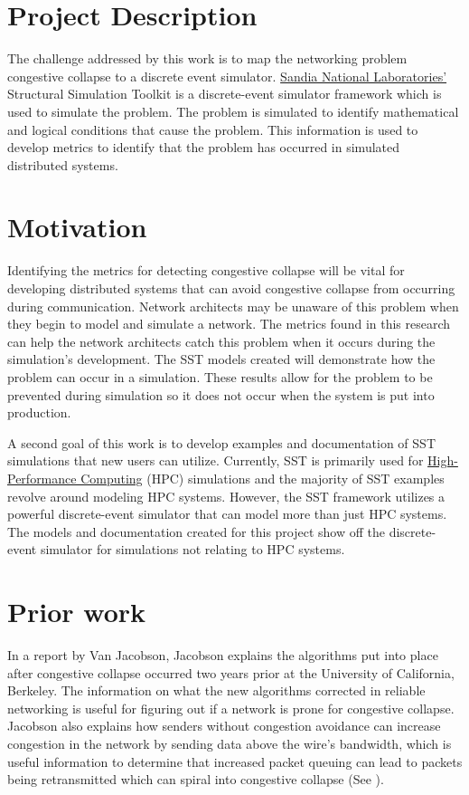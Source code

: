 \documentclass{article}
\begin{document}
\section{Project Description} %

The challenge addressed by this work is to map the networking problem congestive collapse to a discrete event simulator. \href{https://www.sandia.gov/}{Sandia National Laboratories'} Structural Simulation Toolkit is a discrete-event simulator framework which is used to simulate the problem. The problem is simulated to identify mathematical and logical conditions that cause the problem. This information is used to develop metrics to identify that the problem has occurred in simulated distributed systems.

\section{Motivation} %

Identifying the metrics for detecting congestive collapse will be vital for developing distributed systems that can avoid congestive collapse from occurring during communication. Network architects may be unaware of this problem when they begin to model and simulate a network. The metrics found in this research can help the network architects catch this problem when it occurs during the simulation's development. The SST models created will demonstrate how the problem can occur in a simulation. These results allow for the problem to be prevented during simulation so it does not occur when the system is put into production.

A second goal of this work is to develop examples and documentation of SST simulations that new users can utilize. Currently, SST is primarily used for \href{https://en.wikipedia.org/wiki/High-performance_computing}{High-Performance Computing} (HPC) simulations and the majority of SST examples revolve around modeling HPC systems. However, the SST framework utilizes a powerful discrete-event simulator that can model more than just HPC systems. The models and documentation created for this project show off the discrete-event simulator for simulations not relating to HPC systems.

\section{Prior work} %
In a report by Van Jacobson\cite{vanjacob}, Jacobson explains the algorithms put into place after congestive collapse occurred two years prior at the University of California, Berkeley. The information on what the new algorithms corrected in reliable networking is useful for figuring out if a network is prone for congestive collapse. Jacobson also explains how senders without congestion avoidance can increase congestion in the network by sending data above the wire's bandwidth, which is useful information to determine that increased packet queuing can lead to packets being retransmitted which can spiral into congestive collapse (See \cite[p.325]{vanjacob}).
\end{document}
